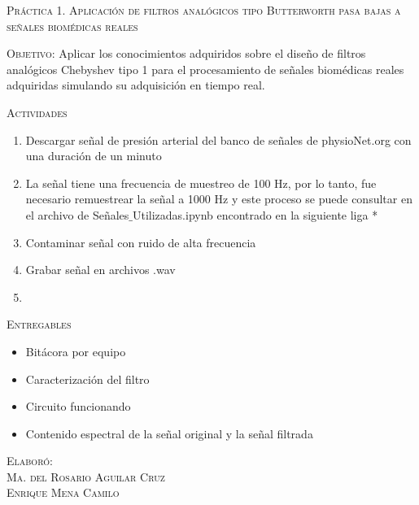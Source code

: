 \documentclass[10pt,letterpaper,spanish,twoside]{report}
\begin{document}
\docdate

\begin{center}
 \textsc{\asignatura}\vspace{.2em}
\end{center}

\textsc{Práctica 1. Aplicación de filtros analógicos tipo Butterworth pasa bajas a señales biomédicas reales}

\textsc{Objetivo:} 
Aplicar los conocimientos adquiridos sobre el diseño de filtros analógicos Chebyshev tipo 1 para el procesamiento de señales biomédicas reales adquiridas simulando su adquisición en tiempo real.

\textsc{Actividades}
\begin{enumerate}
  \item Descargar señal de presión arterial del banco de señales de physioNet.org con una duración de un minuto
  \item La señal tiene una frecuencia de muestreo de 100 Hz, por lo tanto, fue necesario remuestrear la señal a 1000 Hz y este proceso se puede consultar en el archivo de Señales$\_$Utilizadas.ipynb encontrado en la siguiente liga *
  \item Contaminar señal con ruido de alta frecuencia 
  \item Grabar señal en archivos .wav
  \item 
\end{enumerate}

\textsc{Entregables}
\begin{itemize}
  \item Bitácora por equipo
  \item Caracterización del filtro
  \item Circuito funcionando
  \item Contenido espectral de la señal original y la señal filtrada
\end{itemize}


\vfill
\begin{flushright}
\textsc{Elaboró:\\
Ma. del Rosario Aguilar Cruz\\
Enrique Mena Camilo}
\end{flushright}
\end{document}
